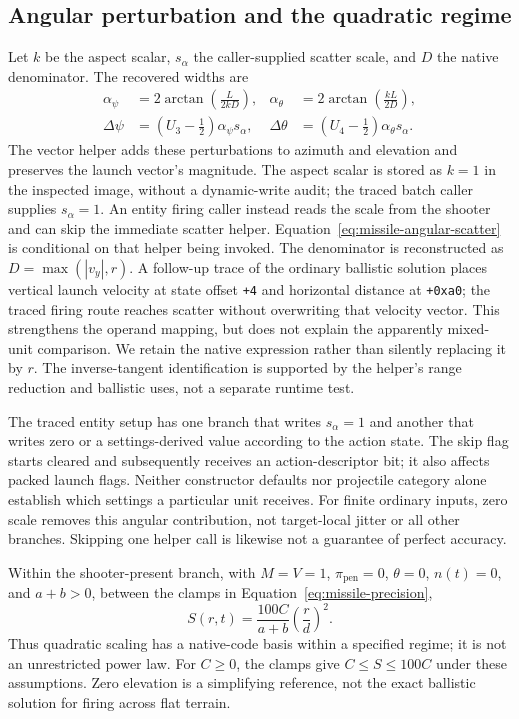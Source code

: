 \documentclass[11pt]{article}
\begin{document}
\subsection{Angular perturbation and the quadratic regime}

Let $k$ be the aspect scalar, $s_\alpha$ the caller-supplied scatter scale,
and $D$ the native denominator.  The recovered widths are
\begin{align}
  \alpha_\psi&=2\arctan\!\left(\frac{L}{2kD}\right),&
  \alpha_\theta&=2\arctan\!\left(\frac{kL}{2D}\right),\\
  \Delta\psi&=(U_3-\tfrac12)\alpha_\psi s_\alpha,&
  \Delta\theta&=(U_4-\tfrac12)\alpha_\theta s_\alpha.
  \label{eq:missile-angular-scatter}
\end{align}
The vector helper adds these perturbations to azimuth and elevation and
preserves the launch vector's magnitude.  The aspect scalar is stored as
$k=1$ in the inspected image, without a dynamic-write audit; the traced
batch caller supplies $s_\alpha=1$.  An entity firing caller instead reads
the scale from the shooter and can skip the immediate scatter helper.
Equation~\ref{eq:missile-angular-scatter} is conditional on that helper being
invoked.  The denominator is reconstructed as
$D=\max(|v_y|,r)$.  A follow-up trace of the ordinary ballistic solution
places vertical launch velocity at state offset \texttt{+4} and horizontal
distance at \texttt{+0xa0}; the traced firing route reaches scatter without
overwriting that velocity vector.  This strengthens the operand mapping,
but does not explain the apparently mixed-unit comparison.  We retain the
native expression rather than silently replacing it by $r$.
The inverse-tangent identification is supported by
the helper's range reduction and ballistic uses, not a separate runtime test.

The traced entity setup has one branch that writes $s_\alpha=1$ and another
that writes zero or a settings-derived value according to the action state.
The skip flag starts cleared and subsequently receives an action-descriptor
bit; it also affects packed launch flags.  Neither constructor defaults nor
projectile category alone establish which settings a particular unit receives.
For finite ordinary inputs, zero scale removes this angular contribution,
not target-local jitter or all other branches.  Skipping one helper call is
likewise not a guarantee of perfect accuracy.

Within the shooter-present branch, with $M=V=1$, $\pi_{\mathrm{pen}}=0$,
$\theta=0$, $n(t)=0$, and $a+b>0$,
between the clamps in Equation~\ref{eq:missile-precision},
\begin{equation}
  S(r,t)=\frac{100C}{a+b}\left(\frac{r}{d}\right)^2.
  \label{eq:missile-quadratic-regime}
\end{equation}
Thus quadratic scaling has a native-code basis within a specified regime;
it is not an unrestricted power law.  For $C\geq0$, the clamps give
$C\leq S\leq100C$ under these assumptions.  Zero elevation is a simplifying
reference, not the exact ballistic solution for firing across flat terrain.
\end{document}
